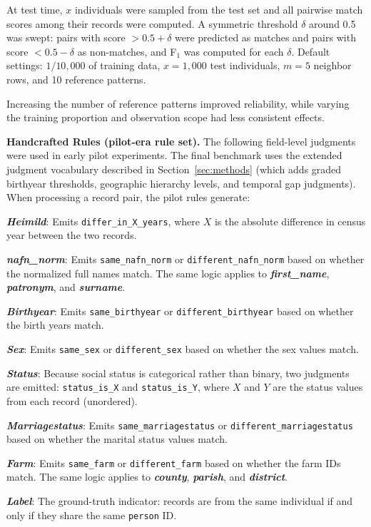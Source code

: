 \documentclass{article}
\begin{document}
At test time, $x$ individuals were sampled from the test set and all pairwise match scores among their records were computed. A symmetric threshold $\delta$ around 0.5 was swept: pairs with score $> 0.5 + \delta$ were predicted as matches and pairs with score $< 0.5 - \delta$ as non-matches, and F$_1$ was computed for each $\delta$. Default settings: $1/10{,}000$ of training data, $x=1{,}000$ test individuals, $m=5$ neighbor rows, and 10 reference patterns.

Increasing the number of reference patterns improved reliability, while varying the training proportion and observation scope had less consistent effects.

\textbf{Handcrafted Rules (pilot-era rule set).} The following field-level judgments were used in early pilot experiments. The final benchmark uses the extended judgment vocabulary described in Section~\ref{sec:methods} (which adds graded birthyear thresholds, geographic hierarchy levels, and temporal gap judgments). When processing a record pair, the pilot rules generate:

\textit{\textbf{Heimild}}: Emits \texttt{differ\_in\_X\_years}, where $X$ is the absolute difference in census year between the two records.

\textit{\textbf{nafn\_norm}}: Emits \texttt{same\_nafn\_norm} or \texttt{different\_nafn\_norm} based on whether the normalized full names match. The same logic applies to \textbf{\textit{first\_name}}, \textbf{\textit{patronym}}, and \textbf{\textit{surname}}.

\textit{\textbf{Birthyear}}: Emits \texttt{same\_birthyear} or \texttt{different\_birthyear} based on whether the birth years match.

\textit{\textbf{Sex}}: Emits \texttt{same\_sex} or \texttt{different\_sex} based on whether the sex values match.

\textit{\textbf{Status}}: Because social status is categorical rather than binary, two judgments are emitted: \texttt{status\_is\_X} and \texttt{status\_is\_Y}, where $X$ and $Y$ are the status values from each record (unordered).

\textit{\textbf{Marriagestatus}}: Emits \texttt{same\_marriagestatus} or \texttt{different\_marriagestatus} based on whether the marital status values match.

\textit{\textbf{Farm}}: Emits \texttt{same\_farm} or \texttt{different\_farm} based on whether the farm IDs match. The same logic applies to \textit{\textbf{county}}, \textit{\textbf{parish}}, and \textit{\textbf{district}}.

\textit{\textbf{Label}}: The ground-truth indicator: records are from the same individual if and only if they share the same \texttt{person} ID.
\end{document}
